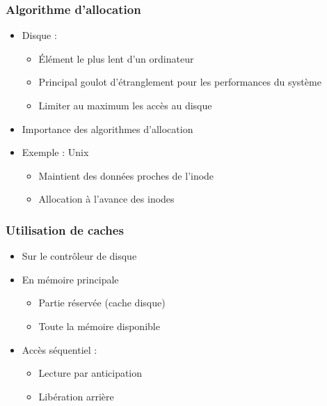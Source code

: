 \begin{frame}
\frametitle{Algorithme d'allocation}
\begin{itemize}
\item Disque :
\begin{itemize}
\item Élément le plus lent d'un ordinateur
\item Principal goulot d'étranglement pour les performances du système
\item Limiter au maximum les accès au disque
\end{itemize}
\item Importance des algorithmes d'allocation
\item Exemple : Unix
\begin{itemize}
\item Maintient des données proches de l'inode
\item Allocation à l'avance des inodes
\end{itemize}
\end{itemize}
\end{frame}

\begin{frame}
\frametitle{Utilisation de caches}
\begin{itemize}
\item Sur le contrôleur de disque
\item En mémoire principale
\begin{itemize}
\item Partie réservée (cache disque)
\item Toute la mémoire disponible
\end{itemize}
\item Accès séquentiel :
\begin{itemize}
\item Lecture par anticipation
\item Libération arrière
\end{itemize}
\end{itemize}
\end{frame}




